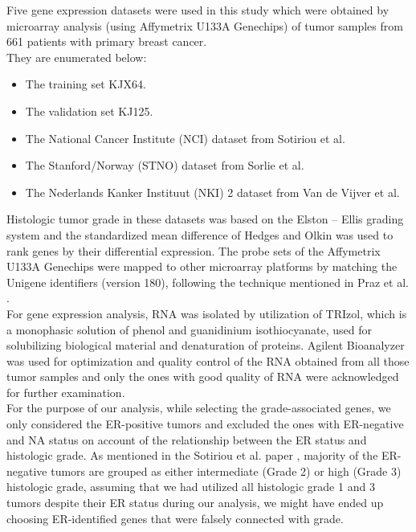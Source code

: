 \documentclass[a4paper,10pt]{article}
\begin{document}
Five gene expression datasets were used in this study which were obtained by
 microarray analysis (using  Affymetrix U133A Genechips) of tumor samples
 from 661 patients with primary breast cancer. \\
They are enumerated below:\\
\begin{itemize}
 \item The training set KJX64.
 \item The validation set KJ125.
 \item The National Cancer Institute (NCI) dataset from Sotiriou et al. \cite{Sotiriou1}
 \item The Stanford/Norway (STNO) dataset from Sorlie et al. \cite{Sorlie1}
 \item The Nederlands Kanker Instituut (NKI) 2 dataset from Van de Vijver et al. \cite{Vijver1}
\end{itemize}

Histologic tumor grade in these datasets was based on the Elston – 
Ellis grading system \cite{Elston1} and the standardized mean difference of Hedges 
and Olkin \cite{Hedges1} was used to rank genes by their differential expression. The probe 
sets of the Affymetrix U133A Genechips were mapped to other microarray platforms
 by matching the Unigene identifiers (version 180), following the technique mentioned 
in Praz et al. \cite{Cleanex}.\\
For gene expression analysis, RNA was isolated by utilization of TRIzol, which 
is a monophasic solution of phenol and guanidinium isothiocyanate, used for 
solubilizing biological material and denaturation of proteins. Agilent Bioanalyzer 
was used for optimization and quality control of the RNA obtained from all those
 tumor samples and only the ones with good quality of RNA were acknowledged 
for further examination.\\

For the purpose of our analysis, while selecting the grade-associated genes, 
we only considered the ER-positive tumors and excluded the ones with ER-negative
 and NA status on account of the relationship between the ER status and histologic 
grade. As mentioned in the Sotiriou et al. paper \cite{Sotiriou}, majority of the ER-negative tumors
 are grouped as either intermediate (Grade 2) or high (Grade 3) histologic grade, 
assuming that we had utilized all histologic grade 1 and 3 tumors despite their ER 
status during our analysis, we might have ended up choosing ER-identified genes
 that were falsely connected with grade.\\
\end{document}
